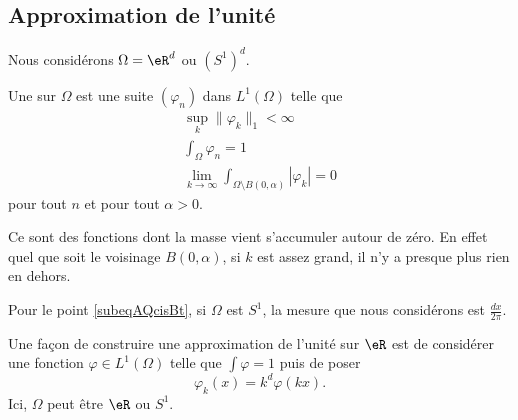 \subsection{Approximation de l'unité}

Nous considérons \( \Omega=\eR^d\) ou \( (S^1)^d\).

\begin{definition}
    Une  sur \( \Omega\) est une suite \( (\varphi_n)\) dans \( L^1(\Omega)\) telle que
    \begin{subequations}
        \begin{align}
            \sup_k \| \varphi_k \|_1 <\infty\\
            \int_{\Omega}\varphi_n=1        \label{subeqAQcisBt}\\
            \lim_{k\to \infty} \int_{\Omega\setminus B(0,\alpha)}| \varphi_k |=0
        \end{align}
    \end{subequations}
    pour tout \( n\) et pour tout \( \alpha>0\).
\end{definition}
Ce sont des fonctions dont la masse vient s'accumuler autour de zéro. En effet quel que soit le voisinage \( B(0,\alpha)\), si \( k\) est assez grand, il n'y a presque plus rien en dehors.

Pour le point \ref{subeqAQcisBt}, si \( \Omega\) est \( S^1\), la mesure que nous considérons est \( \frac{ dx }{ 2\pi }\).


\begin{example}
    Une façon de construire une approximation de l'unité sur \( \eR\) est de considérer une fonction \( \varphi\in L^1(\Omega)\) telle que \( \int\varphi=1\) puis de poser
    \begin{equation}
        \varphi_k(x)=k^d\varphi(kx).
    \end{equation}
    Ici, \( \Omega\) peut être \( \eR\) ou \( S^1\).
\end{example}

